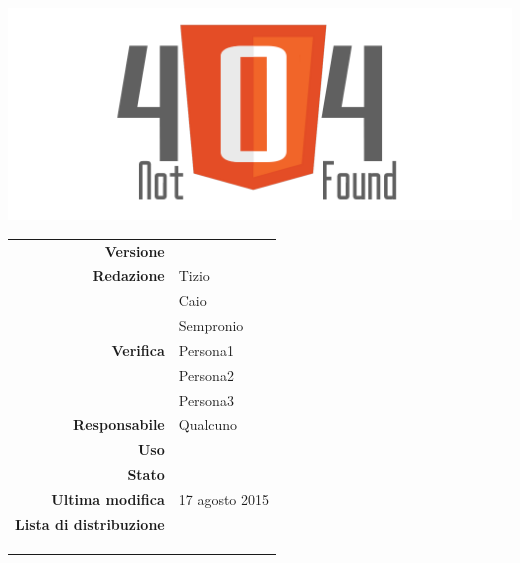 \thispagestyle{empty}

\begin{titlepage}

	\begin{center}
	\begin{Huge}
		\textbf{\gruppo} \\
	\end{Huge}
	\vspace{0.5cm}
	\begin{Large}
		\textbf{\capitolato}
	\end{Large}
	
	\vspace{1cm}

	\includegraphics[scale=0.35]{../logo/logo404_Extends.png}
	\vspace{1cm}
	\begin{Huge}
		\textbf{\titDoc}
	\end{Huge}
	
	\vspace{1cm}
	
	\begin{table}[h]
	\begin{center}
	\begin{tabular}{r | l}
		\textbf{Versione} & \versione \\
		\textbf{Redazione} & Tizio \\ 
			& Caio \\ 
			& Sempronio \\
		\textbf{Verifica} & Persona1 \\ 
			& Persona2 \\ 
			& Persona3 \\
		\textbf{Responsabile} & Qualcuno \\
		\textbf{Uso} & \uso \\
		\textbf{Stato} & \stato \\
		\textbf{Ultima modifica} & 17 agosto 2015 \\
		\textbf{Lista di distribuzione} & \gruppo \\ 
			& \Vardanega \\
			& \Cardin \\
			& \Zucchetti \\
	\end{tabular}
	\end{center}
	\end{table}
	\end{center}
\end{titlepage}